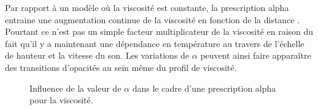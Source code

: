 Par rapport à un modèle où la viscosité est constante, la prescription alpha entraine une augmentation continue de la viscosité en fonction de la distance . Pourtant ce n'est pas un simple facteur multiplicateur de la viscosité en raison du fait qu'il y a maintenant une dépendance en température au travers de l'échelle de hauteur et la vitesse du son. Les variations de $\alpha$ peuvent ainsi faire apparaître des transitions d'opacités au sein même du profil de viscosité. 

\begin{figure}[htbp]
\centering
{}
\hfill
{}

\hfill
{}
\caption[Influence de alpha sur la carte de migration.]{Influence de la valeur de $\alpha$ dans le cadre d'une prescription
alpha pour la viscosité. }\label{fig:alpha_viscosity}
\end{figure}

